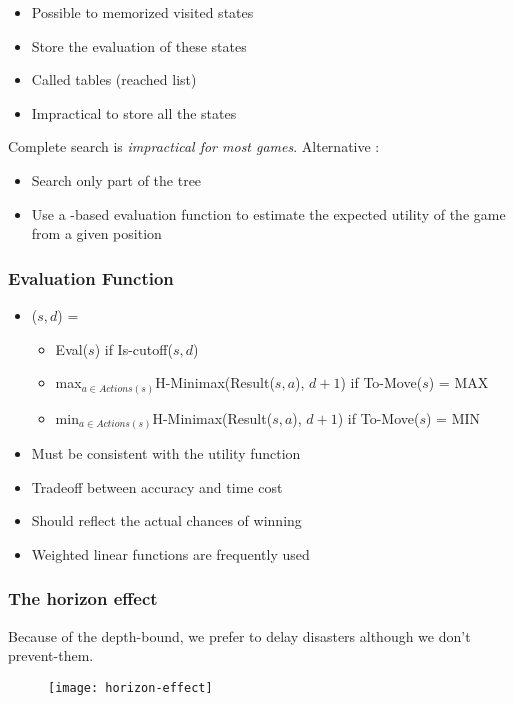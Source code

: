 \begin{itemize}
\item Possible to memorized visited states
\item Store the evaluation of these states
\item Called  tables (reached list)
\item Impractical to store all the states
\end{itemize}

Complete search is \textit{impractical for most games}. Alternative :
\begin{itemize}
\item Search only part of the tree
\item Use a -based evaluation function to estimate the expected utility of the game from a given position
\end{itemize}

\subsubsection{Evaluation Function}

\begin{itemize}
\item {}($s, d$) =
	\begin{itemize}
	\item Eval($s$) if Is-cutoff($s, d$)
	\item max$_{a \in \textit{Actions}(s)}$H-Minimax(Result($s, a$), $d+1$) if To-Move($s$) = MAX
	\item min$_{a \in \textit{Actions}(s)}$H-Minimax(Result($s, a$), $d+1$) if To-Move($s$) = MIN
	\end{itemize}
\item Must be consistent with the utility function
\item Tradeoff between accuracy and time cost
\item Should reflect the actual chances of winning
\item Weighted linear functions are frequently used
\end{itemize}

\subsubsection{The horizon effect}

Because of the depth-bound, we prefer to delay disasters although we don't prevent-them.
\begin{figure}[H]
	\centering
	\texttt{[image: horizon-effect]}
\end{figure}


